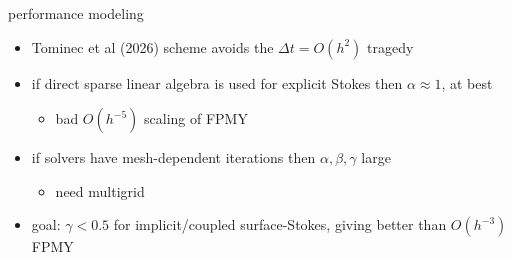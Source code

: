 \documentclass[aspectratio=169,10pt]{beamer}
\newcommand{\lc}{{\text{\large $\circ$}}}
\begin{document}
\begin{frame}{performance modeling}
\begin{overprint}
\begin{itemize}
\item Tominec et al (2026) scheme avoids the $\Delta t=O(h^2)$ tragedy
\end{itemize}
\begin{itemize}
\item if direct sparse linear algebra is used for explicit Stokes then $\alpha\approx 1$, at best
    \begin{itemize}
    \item[$\lc$] bad $O(h^{-5})$ scaling of FPMY \hfill {}
    \end{itemize}
\item if solvers have mesh-dependent iterations then $\alpha,\beta,\gamma$ large
    \begin{itemize}
    \item[$\lc$] need multigrid
    \end{itemize}
\end{itemize}
\begin{itemize}
\item goal: \alert{$\gamma<0.5$ for implicit/coupled surface-Stokes}, giving better than $O(h^{-3})$ FPMY
\end{itemize}
\end{overprint}
\end{frame}


\end{document}
